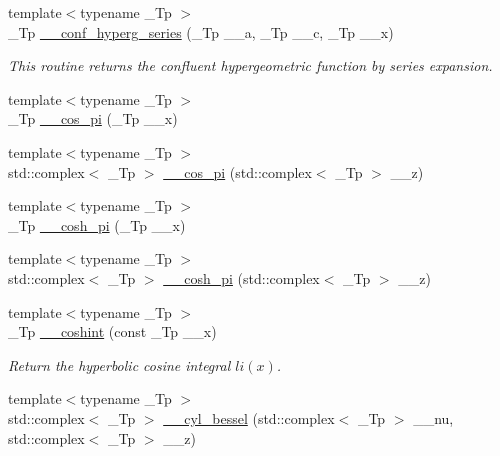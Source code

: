 \begin{DoxyCompactItemize}
{\footnotesize template$<$typename \+\_\+\+Tp $>$ }\\\+\_\+\+Tp \hyperlink{namespacestd_1_1____detail_a5f701a63e17238132405dd209660fc1d}{\+\_\+\+\_\+conf\+\_\+hyperg\+\_\+series} (\+\_\+\+Tp \+\_\+\+\_\+a, \+\_\+\+Tp \+\_\+\+\_\+c, \+\_\+\+Tp \+\_\+\+\_\+x)
\begin{DoxyCompactList}\small\item\em This routine returns the confluent hypergeometric function by series expansion. \end{DoxyCompactList}\item 
{\footnotesize template$<$typename \+\_\+\+Tp $>$ }\\\+\_\+\+Tp \hyperlink{namespacestd_1_1____detail_abfdaa500e1321747a0ad391ca3416a0b}{\+\_\+\+\_\+cos\+\_\+pi} (\+\_\+\+Tp \+\_\+\+\_\+x)
\item 
{\footnotesize template$<$typename \+\_\+\+Tp $>$ }\\std\+::complex$<$ \+\_\+\+Tp $>$ \hyperlink{namespacestd_1_1____detail_a0332c7fb29ed7be543103adc8d04d39d}{\+\_\+\+\_\+cos\+\_\+pi} (std\+::complex$<$ \+\_\+\+Tp $>$ \+\_\+\+\_\+z)
\item 
{\footnotesize template$<$typename \+\_\+\+Tp $>$ }\\\+\_\+\+Tp \hyperlink{namespacestd_1_1____detail_ae6e440447e88191b3cd19daaf7fda96e}{\+\_\+\+\_\+cosh\+\_\+pi} (\+\_\+\+Tp \+\_\+\+\_\+x)
\item 
{\footnotesize template$<$typename \+\_\+\+Tp $>$ }\\std\+::complex$<$ \+\_\+\+Tp $>$ \hyperlink{namespacestd_1_1____detail_a257e13bd4fa9711a87ea68a783ee40d9}{\+\_\+\+\_\+cosh\+\_\+pi} (std\+::complex$<$ \+\_\+\+Tp $>$ \+\_\+\+\_\+z)
\item 
{\footnotesize template$<$typename \+\_\+\+Tp $>$ }\\\+\_\+\+Tp \hyperlink{namespacestd_1_1____detail_ad48a89a591f7b58a047f072e6e383663}{\+\_\+\+\_\+coshint} (const \+\_\+\+Tp \+\_\+\+\_\+x)
\begin{DoxyCompactList}\small\item\em Return the hyperbolic cosine integral $ li(x) $. \end{DoxyCompactList}\item 
{\footnotesize template$<$typename \+\_\+\+Tp $>$ }\\std\+::complex$<$ \+\_\+\+Tp $>$ \hyperlink{namespacestd_1_1____detail_ac4cff6a34fbd90932b47ecdb2445dee2}{\+\_\+\+\_\+cyl\+\_\+bessel} (std\+::complex$<$ \+\_\+\+Tp $>$ \+\_\+\+\_\+nu, std\+::complex$<$ \+\_\+\+Tp $>$ \+\_\+\+\_\+z)

\end{DoxyCompactItemize}
